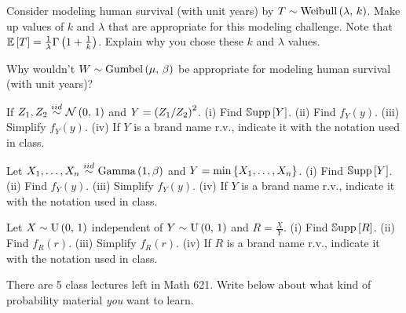 \documentclass[12pt]{article}
\begin{document}
 Consider modeling human survival (with unit years) by $T \sim \weibull{\lambda}{k}$. Make up values of $k$ and $\lambda$ that are appropriate for this modeling challenge. Note that $\expe{T} = \oneover{\lambda}\Gammaf{1 + \oneover{k}}$. Explain why you chose these $k$ and $\lambda$ values. 


 Why wouldn't $W \sim \gumbel{\mu}{\beta}$ be appropriate for modeling human survival (with unit years)? 


 If $Z_1, Z_2 \iid \stdnormnot$ and $Y = \squared{Z_1 / Z_2}$. (i) Find $\support{Y}$. (ii) Find $f_Y(y)$. (iii) Simplify $f_Y(y)$. (iv) If $Y$ is a brand name r.v., indicate it with the notation used in class. 


 Let $\Xoneton \iid \gammadist{1}{\beta}$ and $Y = \min{\Xoneton}$. (i) Find $\support{Y}$. (ii) Find $f_Y(y)$. (iii) Simplify $f_Y(y)$. (iv) If $Y$ is a brand name r.v., indicate it with the notation used in class. 

 Let $X \sim \stduniform$ independent of $Y \sim \stduniform$ and $R = \frac{X}{Y}$. (i) Find $\support{R}$. (ii) Find $f_R(r)$. (iii) Simplify $f_R(r)$. (iv) If $R$ is a brand name r.v., indicate it with the notation used in class. 






\eenum

\problem There are 5 class lectures left in Math 621. Write below about what kind of probability material \emph{you} want to learn. \ingray{[4 pt / 100 pts]}
\end{document}
